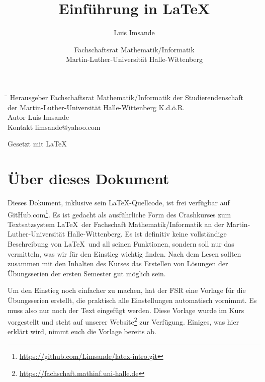 \documentclass[titlepage, parskip=full*]{scrartcl}
\author{Luis Imsande\and Fachschaftsrat Mathematik/Informatik\\Martin-Luther-Universität Halle-Wittenberg}
\title{\Huge Einführung in \LaTeX}
\date{}
\begin{document}
\pagecolor{mlugreenlightarea}
\maketitle



\pagecolor{white}
\thispagestyle{empty}
\begin{tabbing}
\hspace{3cm}\=\kill
Herausgeber \> Fachschaftsrat Mathematik/Informatik der Studierendenschaft \\
\> der Martin-Luther-Universität Halle-Wittenberg K.d.ö.R. \\ 
Autor \> Luis Imsande \\
Kontakt \> limsande@yahoo.com
\end{tabbing} 

Gesetzt mit \LaTeX
\newpage



\setcounter{page}{1}
\tableofcontents
\newpage




\section{Über dieses Dokument}
Dieses Dokument, inklusive sein \LaTeX-Quellcode, ist frei verfügbar auf GitHub.com\footnote{\url{https://github.com/Limsande/latex-intro.git}}. Es ist gedacht als ausführliche Form des Crashkurses zum Textsatzsystem \LaTeX\ der Fachschaft Mathematik/Informatik an der Martin-Luther-Universität Halle-Wittenberg. Es ist definitiv keine vollständige Beschreibung von \LaTeX\ und all seinen Funktionen, sondern soll nur das vermitteln, was wir für den Einstieg wichtig finden. Nach dem Lesen sollten zusammen mit den Inhalten des Kurses das Erstellen von Lösungen der Übungsserien der ersten Semester gut möglich sein.

Um den Einstieg noch einfacher zu machen, hat der FSR eine Vorlage für die Übungsserien erstellt, die praktisch alle Einstellungen automatisch vornimmt. Es muss also nur noch der Text eingefügt werden. Diese Vorlage wurde im Kurs vorgestellt und steht auf unserer Website\footnote{\url{https://fachschaft.mathinf.uni-halle.de}} zur Verfügung. Einiges, was hier erklärt wird, nimmt euch die Vorlage bereits ab.
\end{document}
